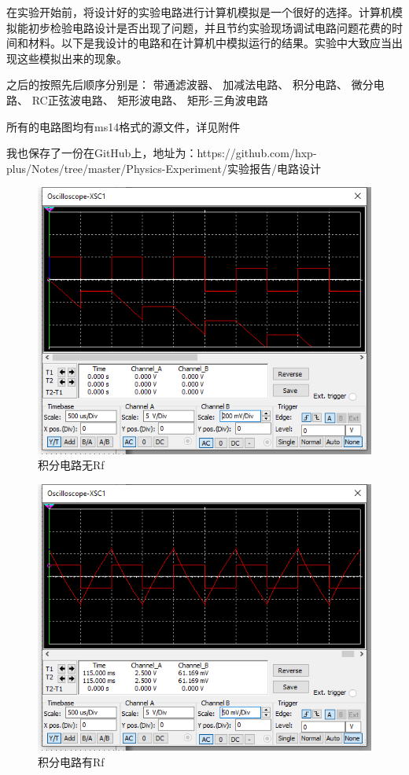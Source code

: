 \documentclass{ctexart}
\begin{document}
在实验开始前，将设计好的实验电路进行计算机模拟是一个很好的选择。计算机模拟能初步检验电路设计是否出现了问题，并且节约实验现场调试电路问题花费的时间和材料。以下是我设计的电路和在计算机中模拟运行的结果。实验中大致应当出现这些模拟出来的现象。

之后的按照先后顺序分别是：
带通滤波器、
加减法电路、
积分电路、
微分电路、
RC正弦波电路、
矩形波电路、
矩形-三角波电路

所有的电路图均有ms14格式的源文件，详见附件

我也保存了一份在GitHub上，地址为：https://github.com/hxp-plus/Notes/tree/master/Physics-Experiment/实验报告/电路设计









\begin{figure}[H]
  \centering
  \includegraphics[width=0.75\linewidth]{电路设计/积分电路/积分电路无Rf.png}
  \caption{积分电路无Rf}
\end{figure}

\begin{figure}[H]
  \centering
  \includegraphics[width=0.75\linewidth]{电路设计/积分电路/积分电路有Rf.png}
  \caption{积分电路有Rf}
\end{figure}
\end{document}
